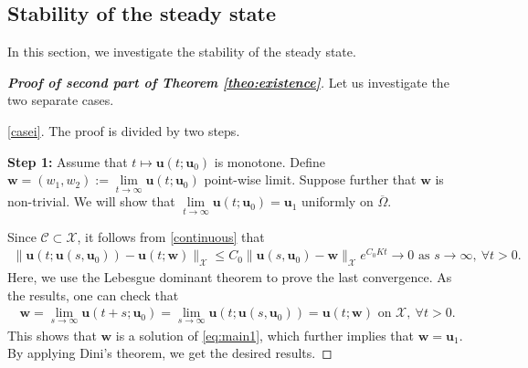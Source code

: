 \documentclass[a4paper,11pt]{amsart}
\newtheorem{theorem}{Theorem}
\theoremstyle{definition}
\def\O{\Omega}
\numberwithin{equation}{section}
\theoremstyle{definition}
\def\O{\Omega}
\begin{document}


\subsection{\bf Stability of the steady state}

In this section, we investigate the stability of the steady state.



\begin{proof}[\bf Proof of second part of Theorem \ref{theo:existence}] Let us investigate the two separate cases.

\ref{casei}. The proof is divided by two steps.

\textbf{Step 1:} Assume that $t\mapsto \textbf{u}(t;\textbf{u}_0)$ is monotone. Define $\textbf{w}=(w_1,w_2):=\lim\limits_{t\rightarrow \infty}\textbf{u}(t;\textbf{u}_0)$ point-wise limit. Suppose further that $\textbf{w}$ is non-trivial. We will show that $\lim\limits_{t\rightarrow \infty}\textbf{u}(t;\textbf{u}_0)=\textbf{u}_1$ uniformly on $\overline{\O}$. 


Since $\mathcal{C}\subset\mathcal{X}$, it follows from \eqref{continuous} that
\begin{align*}
\|\textbf{u}(t;\textbf{u}(s,\textbf{u}_0))-\textbf{u}(t;\textbf{w})\|_{\mathcal{X}}\leq C_0\|\textbf{u}(s,\textbf{u}_0)-\textbf{w}\|_{\mathcal{X}}e^{C_0Kt}\rightarrow 0 \text{ as } s\rightarrow \infty,~\forall t>0.
\end{align*}
Here, we use the Lebesgue dominant theorem to prove the last convergence. As the results, one can check that
\begin{align*}
\textbf{w}=\lim_{s\rightarrow \infty}\textbf{u}(t+s;\textbf{u}_0)=\lim_{s\rightarrow \infty}\textbf{u}(t;\textbf{u}(s,\textbf{u}_0))=\textbf{u}(t;\textbf{w}) \text{ on }\mathcal{X},~\forall t>0.
\end{align*}
This shows that $\textbf{w}$ is a solution of \eqref{eq:main1}, which further implies that $\textbf{w}=\textbf{u}_1$. By applying Dini's theorem, we get the desired results.


\end{proof}
\end{document}
